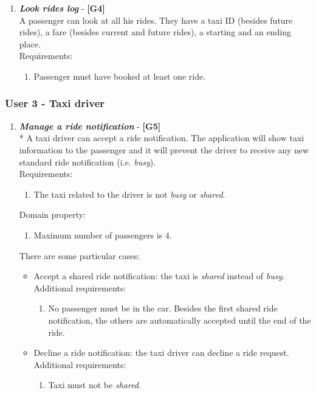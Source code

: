 \documentclass{article}
\begin{document}
\begin{enumerate}
\item \textit{\textbf{Look rides log}} - \textbf{[G4]}\\
A passenger can look at all his rides. They have a taxi ID (besides future rides), a fare (besides current and future rides), a starting and an ending place.\\
Requirements:
\begin{enumerate}
\item Passenger must have booked at least one ride.
\end{enumerate}
\end{enumerate}

\subsubsection{User 3 - Taxi driver}
\begin{enumerate}

\item \textit{\textbf{Manage a ride notification}} - \textbf{[G5]}\\*
A taxi driver can accept a ride notification. The application will show taxi information to the passenger and it will prevent the driver to receive any new standard ride notification  (i.e. \textit{busy}).\\
Requirements:
\begin{enumerate}
\item The taxi related to the driver is not \textit{busy} or \textit{shared}.
\end{enumerate}
Domain property:
\begin{enumerate}
\item Maximum number of passengers is 4.
\end{enumerate}
There are some particular cases:
\begin{itemize}
\item Accept a shared ride notification: the taxi is \textit{shared} instead of \textit{busy}.\\
Additional requirements:
\begin{enumerate}
\item No passenger must be in the car. Besides the first shared ride notification, the others are automatically accepted until the end of the ride.
\end{enumerate}
\item Decline a ride notification: the taxi driver can decline a ride request.\\
Additional requirements:
\begin{enumerate}
\item Taxi must not be \textit{shared}.
\end{enumerate}
\end{itemize}


\end{enumerate}
\end{document}
